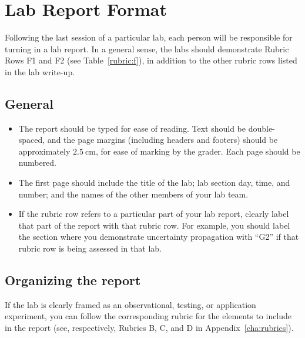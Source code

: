 \chapter{Lab Report Format}

Following the last session of a particular lab, each person will be responsible for turning in a lab report. In a general sense, the labs should demonstrate Rubric Rows F1 and F2 (see Table~\ref{rubric:f}), in addition to the other rubric rows listed in the lab write-up.

\section{General}

\begin{itemize}
	\item The report should be typed for ease of reading. Text should be double-spaced, and the page margins (including headers and footers) should be approximately $2.5\:$cm, for ease of marking by the grader. Each page should be numbered.
	
	\item The first page should include the title of the lab; lab section day, time, and number; and the names of the other members of your lab team.
	
	\item If the rubric row refers to a particular part of your lab report, clearly label that part of the report with that rubric row. For example, you should label the section where you demonstrate uncertainty propagation with ``G2'' if that rubric row is being assessed in that lab.
\end{itemize}

\section{Organizing the report}

If the lab is clearly framed as an observational, testing, or application experiment, you can follow the corresponding rubric for the elements to include in the report (see, respectively, Rubrics B, C, and D in Appendix~\ref{cha:rubrics}).

